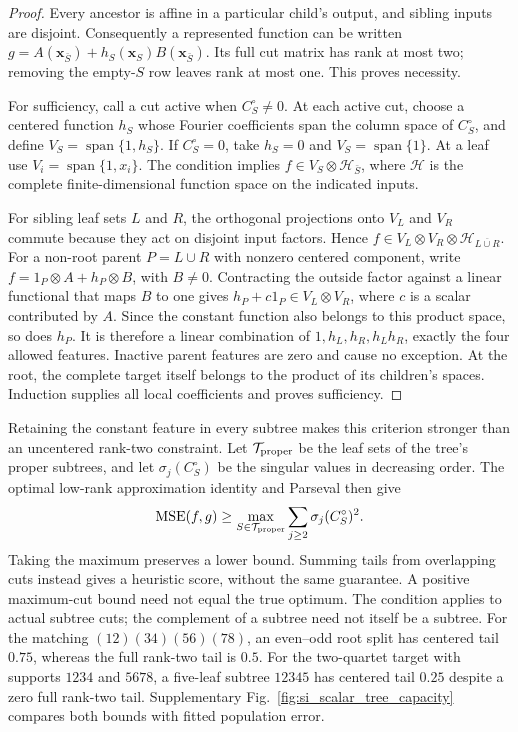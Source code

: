 \begin{proof}
Every ancestor is affine in a particular child's output, and sibling inputs
are disjoint. Consequently a represented function can be written
$g=A(\bm x_{\bar S})+h_S(\bm x_S)B(\bm x_{\bar S})$. Its full cut matrix
has rank at most two; removing the empty-$S$ row leaves rank at most one.
This proves necessity.

For sufficiency, call a cut active when $C_S^\circ\ne0$. At each active
cut, choose a centered function $h_S$ whose
Fourier coefficients span the column space of $C_S^\circ$, and define
$V_S=\operatorname{span}\{1,h_S\}$. If $C_S^\circ=0$, take $h_S=0$ and
$V_S=\operatorname{span}\{1\}$. At a leaf use
$V_i=\operatorname{span}\{1,x_i\}$. The condition implies
$f\in V_S\otimes\mathcal H_{\bar S}$, where $\mathcal H$ is the complete
finite-dimensional function space on the indicated inputs.

For sibling leaf sets $L$ and $R$, the orthogonal projections onto $V_L$
and $V_R$ commute because
they act on disjoint input factors. Hence
$f\in V_L\otimes V_R\otimes\mathcal H_{\overline{L\cup R}}$.
For a non-root parent $P=L\cup R$ with nonzero centered component, write
$f=1_P\otimes A+h_P\otimes B$, with $B\ne0$. Contracting the outside
factor against a linear functional that maps $B$ to one gives
$h_P+c1_P\in V_L\otimes V_R$, where $c$ is a scalar contributed by $A$. Since the constant function also belongs to
this product space, so does $h_P$. It is therefore a linear combination of
$1,h_L,h_R,h_Lh_R$, exactly the four allowed features. Inactive parent
features are zero and cause no exception. At the root, the complete target
itself belongs to the product of its children's spaces. Induction supplies
all local coefficients and proves sufficiency.
\end{proof}

Retaining the constant feature in every subtree makes this criterion
stronger than an uncentered rank-two constraint. Let
$\mathcal T_{\rm proper}$ be the leaf sets of the tree's proper subtrees,
and let $\sigma_j(C_S^\circ)$ be the singular values in decreasing
order. The optimal low-rank approximation identity and Parseval then give
\begin{equation}
 \operatorname{MSE}(f,g)\geq
 \max_{S\in\mathcal T_{\rm proper}}
       \sum_{j\geq2}\sigma_j(C_S^\circ)^2.
 \label{eq:s_centered_cut_bound}
\end{equation}
Taking the maximum preserves a lower bound. Summing tails from overlapping
cuts instead gives a heuristic score, without the same guarantee. A positive maximum-cut bound need not equal the true optimum.
The condition applies to actual subtree cuts; the complement of a subtree
need not itself be a subtree. For the matching $(12)(34)(56)(78)$, an
even--odd root split has centered tail $0.75$, whereas the full rank-two tail
is $0.5$. For the two-quartet target with supports $1234$ and $5678$, a
five-leaf subtree $12345$ has centered tail $0.25$ despite a zero full
rank-two tail. Supplementary Fig.~\ref{fig:si_scalar_tree_capacity}
compares both bounds with fitted population error.

